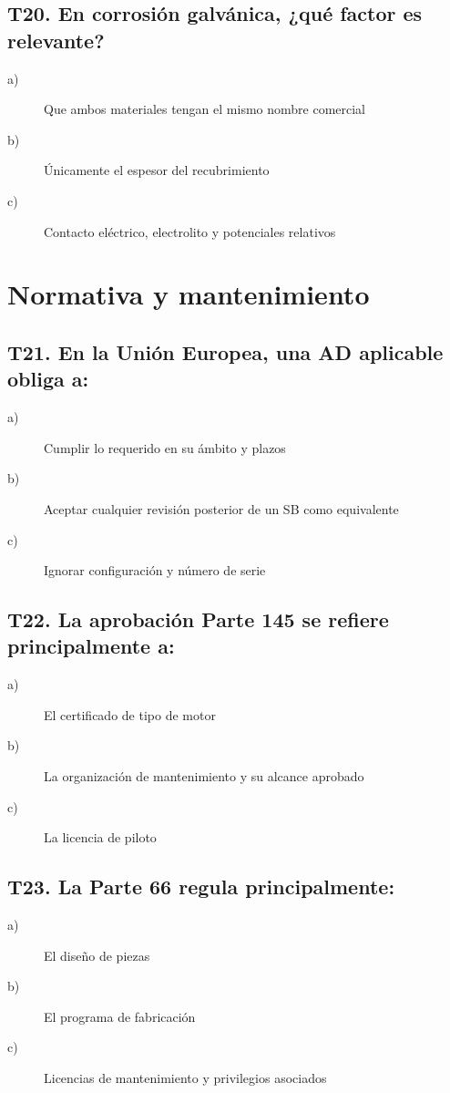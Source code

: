 \subsection*{T20. En corrosión galvánica, ¿qué factor es relevante?}
\begin{description}
\item[a)] Que ambos materiales tengan el mismo nombre comercial
\item[b)] Únicamente el espesor del recubrimiento
\item[c)] Contacto eléctrico, electrolito y potenciales relativos
\end{description}

\section*{Normativa y mantenimiento}
\subsection*{T21. En la Unión Europea, una AD aplicable obliga a:}
\begin{description}
\item[a)] Cumplir lo requerido en su ámbito y plazos
\item[b)] Aceptar cualquier revisión posterior de un SB como equivalente
\item[c)] Ignorar configuración y número de serie
\end{description}

\subsection*{T22. La aprobación Parte 145 se refiere principalmente a:}
\begin{description}
\item[a)] El certificado de tipo de motor
\item[b)] La organización de mantenimiento y su alcance aprobado
\item[c)] La licencia de piloto
\end{description}

\subsection*{T23. La Parte 66 regula principalmente:}
\begin{description}
\item[a)] El diseño de piezas
\item[b)] El programa de fabricación
\item[c)] Licencias de mantenimiento y privilegios asociados
\end{description}

